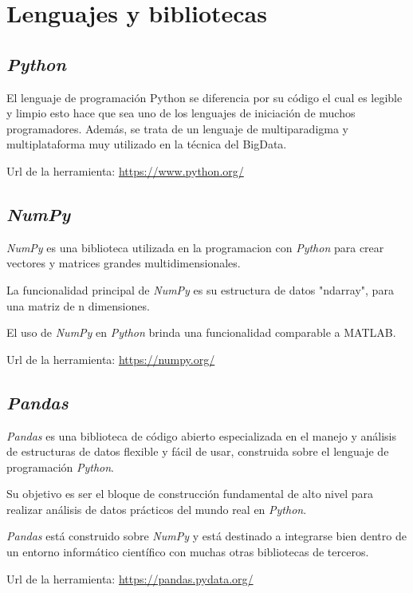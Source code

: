 \section{Lenguajes y bibliotecas}

\subsection{\textit{Python}}

El lenguaje de programación Python se diferencia por su código el cual es legible y limpio esto hace que sea uno de los lenguajes de iniciación de muchos programadores. Además, se trata de un lenguaje de multiparadigma y multiplataforma muy utilizado en la técnica del BigData.

Url de la herramienta: \url{https://www.python.org/}

\subsection{\textit{NumPy}}

\textit{NumPy} es una biblioteca utilizada en la programacion con \textit{Python} para crear vectores y matrices grandes multidimensionales.

La funcionalidad principal de \textit{NumPy} es su estructura de datos "ndarray", para una matriz de n dimensiones.

El uso de \textit{NumPy} en \textit{Python} brinda una funcionalidad comparable a MATLAB.

Url de la herramienta: \url{https://numpy.org/}

\subsection{\textit{Pandas}}

\textit{Pandas} es una biblioteca de código abierto especializada en el manejo y análisis de estructuras de datos flexible y fácil de usar, construida sobre el lenguaje de programación \textit{Python}.

Su objetivo es ser el bloque de construcción fundamental de alto nivel para realizar análisis de datos prácticos del mundo real en \textit{Python}.

\textit{Pandas} está construido sobre \textit{NumPy} y está destinado a integrarse bien dentro de un entorno informático científico con muchas otras bibliotecas de terceros.

Url de la herramienta: \url{https://pandas.pydata.org/}

